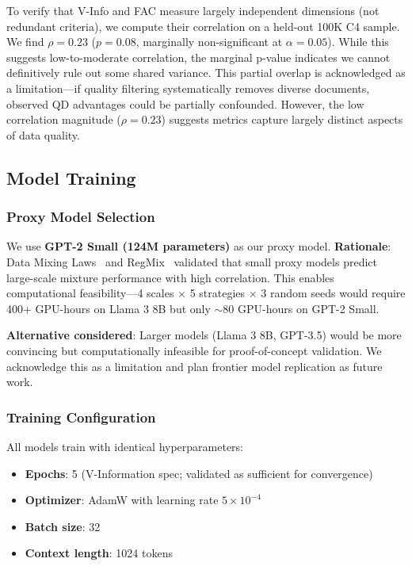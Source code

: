 To verify that V-Info and FAC measure largely independent dimensions (not redundant criteria), we compute their correlation on a held-out 100K C4 sample. We find $\rho=0.23$ ($p=0.08$, marginally non-significant at $\alpha=0.05$). While this suggests low-to-moderate correlation, the marginal p-value indicates we cannot definitively rule out some shared variance. This partial overlap is acknowledged as a limitation---if quality filtering systematically removes diverse documents, observed QD advantages could be partially confounded. However, the low correlation magnitude ($\rho=0.23$) suggests metrics capture largely distinct aspects of data quality.

\subsection{Model Training}

\subsubsection{Proxy Model Selection}

We use \textbf{GPT-2 Small (124M parameters)} as our proxy model. \textbf{Rationale}: Data Mixing Laws~\cite{mixinglaws2024} and RegMix~\cite{regmix2024} validated that small proxy models predict large-scale mixture performance with high correlation. This enables computational feasibility---4 scales $\times$ 5 strategies $\times$ 3 random seeds would require 400+ GPU-hours on Llama 3 8B but only $\sim$80 GPU-hours on GPT-2 Small.

\textbf{Alternative considered}: Larger models (Llama 3 8B, GPT-3.5) would be more convincing but computationally infeasible for proof-of-concept validation. We acknowledge this as a limitation and plan frontier model replication as future work.

\subsubsection{Training Configuration}

All models train with identical hyperparameters:
\begin{itemize}
\item \textbf{Epochs}: 5 (V-Information spec; validated as sufficient for convergence)
\item \textbf{Optimizer}: AdamW with learning rate $5 \times 10^{-4}$
\item \textbf{Batch size}: 32
\item \textbf{Context length}: 1024 tokens
\end{itemize}

